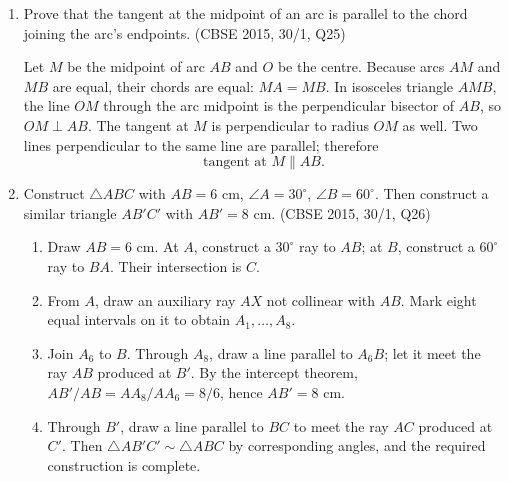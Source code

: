 \begin{enumerate}[label=\textbf{Q\arabic*.},ref=\arabic*,start=21]
\solution Let $PA$ and $PB$ touch the circle at $A$ and $B$, with centre $O$. Join $OA$, $OB$, and $OP$. Since a radius is perpendicular to a tangent, $\angle OAP=\angle OBP=90^\circ$. Also $OA=OB$ (radii) and $OP$ is common. Hence $\triangle OAP\cong\triangle OBP$ by RHS, so corresponding sides satisfy
\[
\boxed{PA=PB}.
\]

\item Prove that the tangent at the midpoint of an arc is parallel to the chord joining the arc's endpoints. \hfill (CBSE 2015, 30/1, Q25)

\solution Let $M$ be the midpoint of arc $AB$ and $O$ be the centre. Because arcs $AM$ and $MB$ are equal, their chords are equal: $MA=MB$. In isosceles triangle $AMB$, the line $OM$ through the arc midpoint is the perpendicular bisector of $AB$, so $OM\perp AB$. The tangent at $M$ is perpendicular to radius $OM$ as well. Two lines perpendicular to the same line are parallel; therefore
\[
\boxed{\text{tangent at }M\parallel AB}.
\]

\item Construct $\triangle ABC$ with $AB=6$ cm, $\angle A=30^\circ$, $\angle B=60^\circ$. Then construct a similar triangle $AB'C'$ with $AB'=8$ cm. \hfill (CBSE 2015, 30/1, Q26)

\solution
\begin{enumerate}[label=(\alph*)]
\item Draw $AB=6$ cm. At $A$, construct a $30^\circ$ ray to $AB$; at $B$, construct a $60^\circ$ ray to $BA$. Their intersection is $C$.
\item From $A$, draw an auxiliary ray $AX$ not collinear with $AB$. Mark eight equal intervals on it to obtain $A_1,\ldots,A_8$.
\item Join $A_6$ to $B$. Through $A_8$, draw a line parallel to $A_6B$; let it meet the ray $AB$ produced at $B'$. By the intercept theorem, $AB'/AB=AA_8/AA_6=8/6$, hence $AB'=8$ cm.
\item Through $B'$, draw a line parallel to $BC$ to meet the ray $AC$ produced at $C'$. Then $\triangle AB'C'\sim\triangle ABC$ by corresponding angles, and the required construction is complete.
\end{enumerate}


\end{enumerate}
